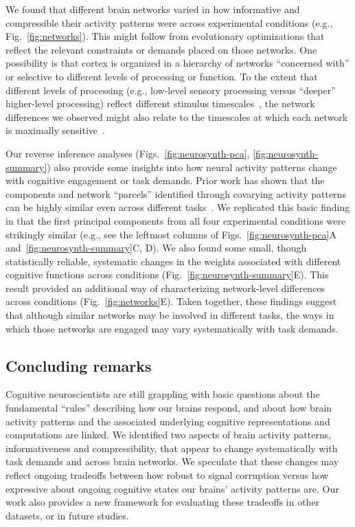 \documentclass[english, 11pt]{article}
\begin{document}
We found that different brain networks varied in how informative and
compressible their activity patterns were across experimental conditions (e.g.,
Fig.~\ref{fig:networks}). This might
follow from evolutionary optimizations that reflect the relevant constraints or
demands placed on those networks. One possibility is that cortex is organized
in a hierarchy of networks ``concerned with'' or selective to different levels
of processing or function. To the extent that different levels of processing
(e.g., low-level sensory processing versus ``deeper'' higher-level processing)
reflect different stimulus timescales~\citep[e.g.,][]{Mann23b}, the network
differences we observed might also relate to the timescales at which each
network is maximally sensitive~\citep{RegeEtal18, BaldEtal17,LernEtal11,
HassEtal08}.

Our reverse inference analyses (Figs.~\ref{fig:neurosynth-pca},
\ref{fig:neurosynth-summary}) also provide some insights into how neural
activity patterns change with cognitive engagement or task demands. Prior work
has shown that the components and network ``parcels'' identified through
covarying activity patterns can be highly similar even across different
tasks~\citep[including ``rest,'' e.g.,][]{SmitEtal09, LairEtal11}. We
replicated this basic finding in that the first principal components from all
four experimental conditions were strikingly similar (e.g., see the leftmost
columns of Figs.~\ref{fig:neurosynth-pca}A and~\ref{fig:neurosynth-summary}C,
D). We also found some small, though statistically reliable, systematic changes
in the weights associated with different cognitive functions across conditions
(Fig.~\ref{fig:neurosynth-summary}E). This result provided an additional way of
characterizing network-level differences across conditions
(Fig.~\ref{fig:networks}E).  Taken together, these findings suggest that although
similar networks may be involved in different tasks, the ways in which those
networks are engaged may vary systematically with task demands.



\subsection*{Concluding remarks}

Cognitive neuroscientists are still grappling with basic questions about the
fundamental ``rules'' describing how our brains respond, and about how brain
activity patterns and the associated underlying cognitive representations and
computations are linked. We identified two aspects of brain activity patterns,
informativeness and compressibility, that appear to change systematically with
task demands and across brain networks. We speculate that these changes may
reflect ongoing tradeoffs between how robust to signal corruption versus how
expressive about ongoing cognitive states our brains' activity patterns are.
Our work also provides a new framework for evaluating these tradeoffs in other
datasets, or in future studies.
\end{document}
